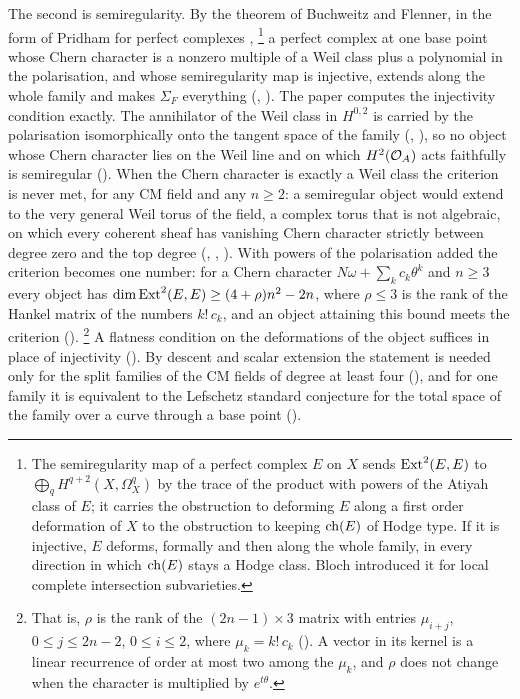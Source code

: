 The second is semiregularity. By the theorem of Buchweitz and Flenner, in the
form of Pridham for perfect complexes \cite{BF03,Pri24},%
\footnote{The semiregularity map of a perfect complex $E$ on $X$ sends
$\operatorname{Ext}^{2}(E,E)$ to $\bigoplus_{q}H^{q+2}(X,\Omega^{q}_{X})$ by the trace of
the product with powers of the Atiyah class of $E$; it carries the
obstruction to deforming $E$ along a first order deformation of $X$ to the
obstruction to keeping $\operatorname{ch}(E)$ of Hodge type. If it is injective, $E$
deforms, formally and then along the whole family, in every direction in
which $\operatorname{ch}(E)$ stays a Hodge class. Bloch introduced it for local complete
intersection subvarieties.}
a perfect complex at
one base point whose Chern character is a nonzero multiple of a Weil class
plus a polynomial in the polarisation, and whose semiregularity map is
injective, extends along the whole family and makes $\Sigma_{F}$ everything
(, \cite[Theorem~17.7(v)]{paperI}). The paper computes
the injectivity condition exactly. The annihilator of the Weil class in
$H^{0,2}$ is carried by the polarisation isomorphically onto the tangent space
of the family (\cite[Lemma~9.6]{paperI}, \cite[Theorem~9.17]{paperI}), so no object
whose Chern character lies on the Weil line and on which $H^{2}(\mathcal{O}_{A})$ acts
faithfully is semiregular (\cite[Theorem~9.7]{paperI}). When the Chern character is
exactly a Weil class the criterion is never met, for any CM field and any
$n\ge2$: a semiregular object would extend to the very general Weil torus of
the field, a complex torus that is not algebraic, on which every coherent
sheaf has vanishing Chern character strictly between degree zero and the top
degree (, ,
). With powers of the polarisation added the criterion
becomes one number: for a Chern character $N\omega+\sum_{k}c_{k}\theta^{k}$
and $n\ge3$ every object has $\dim\operatorname{Ext}^{2}(E,E)\ge(4+\rho)n^{2}-2n$, where
$\rho\le3$ is the rank of the Hankel matrix of the numbers $k!\,c_{k}$, and
an object attaining this bound meets the criterion
().%
\footnote{That is, $\rho$ is the rank of the $(2n-1)\times3$ matrix with
entries $\mu_{i+j}$, $0\le j\le2n-2$, $0\le i\le2$, where $\mu_{k}=k!\,c_{k}$
(). A vector in its kernel is a linear recurrence of order
at most two among the $\mu_{k}$, and $\rho$ does not change when the character
is multiplied by $e^{t\theta}$.}
A flatness condition on the deformations of the object suffices in place of
injectivity (). By descent and scalar extension the
statement is needed only for the split families of the CM fields of degree at
least four (\cite[Proposition~2.13]{paperIII}), and for one family it is equivalent to the
Lefschetz standard conjecture for the total space of the family over a curve
through a base point (\cite[Corollary~2.31]{paperIII}).

